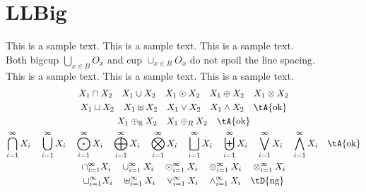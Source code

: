 \section{LLBig}

This is a sample text.
This is a sample text.
This is a sample text.\\
Both
bigcup $\bigcup_{x \in B} O_x$ and
cup $\cup_{x \in B} O_x$ do not spoil the line spacing.\\
This is a sample text.
This is a sample text.
This is a sample text.
\begin{gather*}
	X_1 \cap X_2 \quad
	X_1 \cup X_2 \quad
	X_1 \odot X_2 \quad
	X_1 \oplus X_2 \quad
	X_1 \otimes X_2 \\
	X_1 \sqcup X_2 \quad
	X_1 \uplus X_2 \quad
	X_1 \vee X_2 \quad
	X_1 \wedge X_2 \quad
	\text{\tA{ok}} \\
	X_1 \oplus_{\mathbb{R}} X_2 \quad
	X_1 \oplus_R X_2 \quad
	\text{\tA{ok}} \\
	\bigcap_{i=1}^{\infty} X_i \quad
	\bigcup_{i=1}^{\infty} X_i \quad
	\bigodot_{i=1}^{\infty} X_i \quad
	\bigoplus_{i=1}^{\infty} X_i \quad
	\bigotimes_{i=1}^{\infty} X_i \quad
	\bigsqcup_{i=1}^{\infty} X_i \quad
	\biguplus_{i=1}^{\infty} X_i \quad
	\bigvee_{i=1}^{\infty} X_i \quad
	\bigwedge_{i=1}^{\infty} X_i \quad
	\text{\tA{ok}} \\
	\cap_{i=1}^{\infty} X_i \quad
	\cup_{i=1}^{\infty} X_i \quad
	\odot_{i=1}^{\infty} X_i \quad
	\oplus_{i=1}^{\infty} X_i \quad
	\otimes_{i=1}^{\infty} X_i \\
	\sqcup_{i=1}^{\infty} X_i \quad
	\uplus_{i=1}^{\infty} X_i \quad
	\vee_{i=1}^{\infty} X_i \quad
	\wedge_{i=1}^{\infty} X_i \quad
	\text{\tD{ng}}
\end{gather*}
